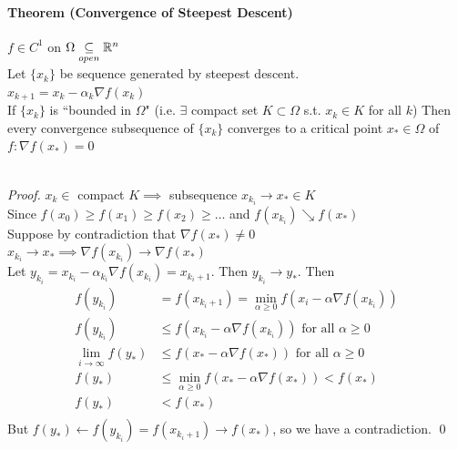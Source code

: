 \documentclass[11pt]{article}
\begin{document}
\paragraph{Theorem (Convergence of Steepest Descent)}
$f \in C^1$ on $\Omega \underset{open}{\subseteq} \mathbb{R}^n$ \\
Let $\{ x_k\}$ be sequence generated by steepest descent. \\
$x_{k+1} = x_k - \alpha_k \nabla f(x_k)$ \\
If $\{ x_k\}$ is ``bounded in $\Omega$" (i.e. $\exists$ compact set $K \subset \Omega$ s.t. $x_k \in K$ for all $k$)
Then every convergence subsequence of $\{ x_k\}$ converges to a critical point $x_* \in \Omega$ of $f: \nabla f(x_*) = 0$\\\\
\begin{proof}
	$x_k \in$ compact $K \implies$ subsequence $x_{k_i} \rightarrow x_* \in K$ \\
	Since $f(x_0) \geq f(x_1) \geq f(x_2) \geq \hdots$ and $f(x_{k_i}) \searrow f(x_*)$\\
	Suppose by contradiction that $\nabla f(x_*) \neq 0$ \\
	$x_{k_i} \rightarrow x_* \implies  \nabla f(x_{k_i}) \rightarrow \nabla f(x_*)$\\
	Let $y_{k_i} = x_{k_i} - \alpha_{k_i} \nabla f(x_{k_i}) = x_{k_i + 1}$. Then $y_{k_i} \rightarrow y_*$. Then
	\begin{align}
		f(y_{k_i}) &= f(x_{k_i + 1} ) = \underset{\alpha \geq 0}{\min} f(x_i - \alpha \nabla f(x_{k_i}))  \\
		f(y_{k_i}) &\leq f(x_{k_i} - \alpha \nabla f(x_{k_i})) \text{ for all $\alpha \geq 0$}\\
		\underset{i \rightarrow \infty}{\lim} f(y_*) &\leq f(x_* - \alpha \nabla f(x_*)) \text{ for all $\alpha \geq 0$} \\
		f(y_*) &\leq  \underset{\alpha \geq 0}{\min} f(x_* - \alpha \nabla f(x_*)) < f(x_*) \\
		f(y_*) &< f(x_*)\\
	\end{align}
	But $f(y_*) \leftarrow f(y_{k_i}) = f(x_{k_i + 1}) \rightarrow f(x_*)$, so we have a contradiction. \qed
\end{proof}
\end{document}
